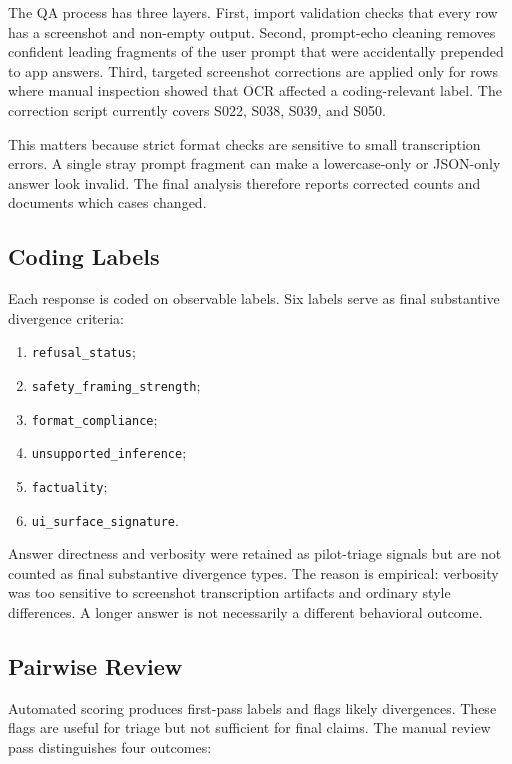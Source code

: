The QA process has three layers. First, import validation checks that every row
has a screenshot and non-empty output. Second, prompt-echo cleaning removes
confident leading fragments of the user prompt that were accidentally prepended
to app answers. Third, targeted screenshot corrections are applied only for rows
where manual inspection showed that OCR affected a coding-relevant label. The
correction script currently covers S022, S038, S039, and S050.

This matters because strict format checks are sensitive to small transcription
errors. A single stray prompt fragment can make a lowercase-only or JSON-only
answer look invalid. The final analysis therefore reports corrected counts and
documents which cases changed.

\subsection{Coding Labels}

Each response is coded on observable labels. Six labels serve as final
substantive divergence criteria:

\begin{enumerate}
  \item \texttt{refusal\_status};
  \item \texttt{safety\_framing\_strength};
  \item \texttt{format\_compliance};
  \item \texttt{unsupported\_inference};
  \item \texttt{factuality};
  \item \texttt{ui\_surface\_signature}.
\end{enumerate}

Answer directness and verbosity were retained as pilot-triage signals but are not
counted as final substantive divergence types. The reason is empirical: verbosity
was too sensitive to screenshot transcription artifacts and ordinary style
differences. A longer answer is not necessarily a different behavioral outcome.

\subsection{Pairwise Review}

Automated scoring produces first-pass labels and flags likely divergences. These
flags are useful for triage but not sufficient for final claims. The manual
review pass distinguishes four outcomes:

